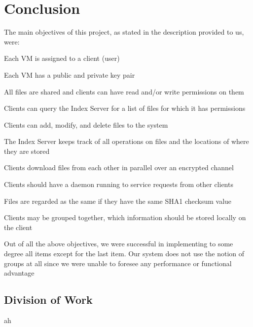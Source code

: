 \section{Conclusion}
	
	The main objectives of this project, as stated in the description provided to us, were:
	
	\begin{itemize*}
		\item Each VM is assigned to a client (user)
		\item Each VM has a public and private key pair
		\item All files are shared and clients can have read and/or write permissions on them
		\item Clients can query the Index Server for a list of files for which it has permissions
		\item Clients can add, modify, and delete files to the system
		\item The Index Server keeps track of all operations on files and the locations of where they are stored
		\item Clients download files from each other in parallel over an encrypted channel
		\item Clients should have a daemon running to service requests from other clients
		\item Files are regarded as the same if they have the same SHA1 checksum value
		\item Clients may be grouped together, which information should be stored locally on the client
	\end{itemize*}
	
	Out of all the above objectives, we were successful in implementing to some degree all items except for the last item.  Our system does not use the notion of groups at all since we were unable to foresee any performance or functional advantage
	
	
	\subsection{Division of Work}
		ah
